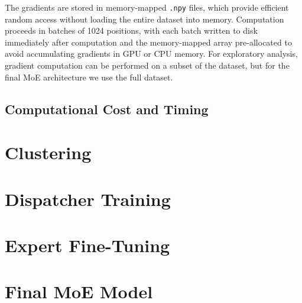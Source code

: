 The gradients are stored in memory-mapped \texttt{.npy} files, which provide efficient random access without loading the entire dataset into memory. Computation proceeds in batches of 1024 positions, with each batch written to disk immediately after computation and the memory-mapped array pre-allocated to avoid accumulating gradients in GPU or CPU memory. For exploratory analysis, gradient computation can be performed on a subset of the dataset, but for the final MoE architecture we use the full dataset.

\subsection{Computational Cost and Timing}\label{sec:grad-cost}


\section{Clustering}\label{sec:clustering-impl}


\section{Dispatcher Training}\label{sec:dispatcher-impl}


\section{Expert Fine-Tuning}\label{sec:expert-impl}


\section{Final MoE Model}\label{sec:final-moe}


